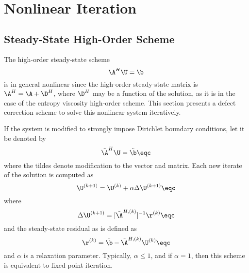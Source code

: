 \section{Nonlinear Iteration}
\subsection{Steady-State High-Order Scheme}
The high-order steady-state scheme
\begin{equation}
   \A^H\U = \b
\end{equation}
is in general nonlinear since the high-order steady-state matrix is
$\A^H = \A + \D^H$, where $\D^H$ may be a function of the solution, as
it is in the case of the entropy viscosity high-order scheme.
This section presents a defect correction scheme to solve this
nonlinear system iteratively.

If the system is modified to strongly impose Dirichlet
boundary conditions, let it be denoted by
\begin{equation}
   \tilde{\A}^H\U = \tilde{\b} \eqc
\end{equation}
where the tildes denote modification to the vector and matrix.
Each new iterate of the solution is computed as
\begin{equation}
   \U^{(k+1)} = \U^{(k)} + \alpha\Delta\U^{(k+1)} \eqc
\end{equation}
where
\begin{equation}
   \Delta\U^{(k+1)} = [\tilde{\A}^{H,(k)}]^{-1}\r^{(k)} \eqc
\end{equation}
and the steady-state residual as is defined as
\begin{equation}\label{ssres_ss}
   \r^{(k)} = \tilde{\b} - \tilde{\A}^{H,(k)}\U^{(k)} \eqc
\end{equation}
and $\alpha$ is a relaxation parameter. Typically, $\alpha\le 1$,
and if $\alpha=1$, then this scheme is equivalent to fixed point iteration.

